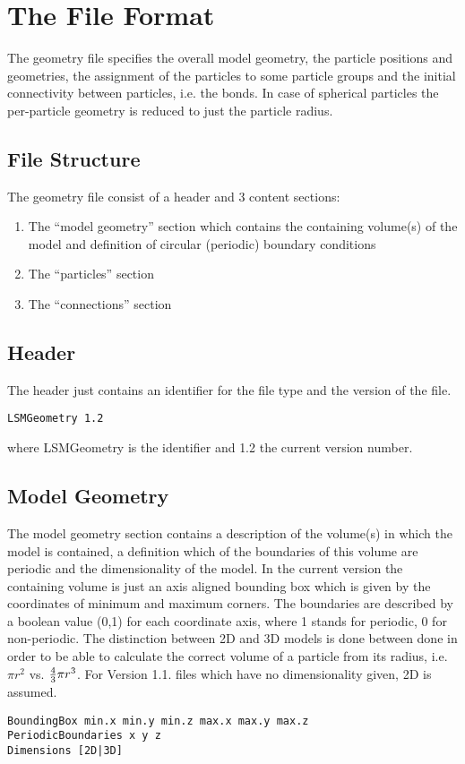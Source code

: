 \documentclass{article}
\begin{document}
\section{The File Format}

The geometry file specifies the overall model geometry, the particle positions and geometries, the assignment of the particles to some particle groups and the initial connectivity between particles, i.e. the bonds. In case of spherical particles the per-particle geometry is reduced to just the particle radius. 
\subsection{File Structure}
The geometry file consist of a header and 3 content sections:
\begin{enumerate}
\item The ``model geometry'' section which contains the containing volume(s) of the model and definition of circular (periodic) boundary conditions
\item The ``particles'' section
\item The ``connections'' section 
\end{enumerate}
\subsection{Header}
The header just contains an identifier for the file type and the version of the file. 
\begin{verbatim}
LSMGeometry 1.2
\end{verbatim}
where \textsf{LSMGeometry} is the identifier and \textsf{1.2} the current version number.


\subsection{Model Geometry}

The model geometry section contains a description of the volume(s) in which the model is contained, a definition which of the boundaries of this volume are periodic and the dimensionality of the model. In the current version the containing volume is just an axis aligned bounding box which is given by the coordinates of minimum and maximum corners. The boundaries are described by a boolean value (0,1) for each coordinate axis, where 1 stands for periodic, 0 for non-periodic. The distinction between 2D and 3D models is done between done in order to be able to calculate the correct volume of a particle from its radius, i.e. $\pi r^2$ vs. ${4 \over 3} \pi r^3$. For Version 1.1. files which have no dimensionality given, 2D is assumed.
\begin{verbatim}
BoundingBox min.x min.y min.z max.x max.y max.z
PeriodicBoundaries x y z
Dimensions [2D|3D]
\end{verbatim}
\end{document}

